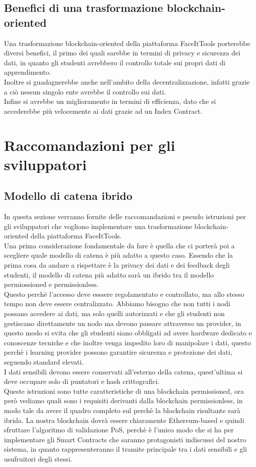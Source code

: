 \subsection{Benefici di una trasformazione blockchain-oriented}
Una trasformazione blockchain-oriented della piattaforma FaceItTools porterebbe diversi benefici, 
il primo dei quali sarebbe in termini di privacy e sicurezza dei dati, in quanto gli studenti avrebbero il controllo totale sui propri dati di apprendimento.
\\Inoltre si guadagnerebbe anche nell'ambito della decentralizzazione, infatti grazie a ciò nessun singolo ente avrebbe il controllo sui dati.
\\Infine si avrebbe un miglioramento in termini di efficienza, dato che si accederebbe più velocemente ai dati grazie ad un Index Contract.
\newpage
\section{Raccomandazioni per gli sviluppatori}
\subsection{Modello di catena ibrido}
In questa sezione verranno fornite delle raccomandazioni e pseudo istruzioni per gli sviluppatori che vogliono implementare una trasformazione blockchain-oriented della piattaforma FaceItTools.
\\Una prima considerazione fondamentale da fare è quella che ci porterà poi a scegliere quale modello di catena è più adatto a questo caso.
Essendo che la prima cosa da andare a rispettare è la privacy dei dati e dei feedback degli studenti, 
il modello di catena più adatto sarà un ibrido tra il modello permiossioned e permissionless.
\\Questo perchè l'accesso deve esssere regolamentato e controllato, ma allo stesso tempo non deve essere centralizzato.
Abbiamo bisogno che non tutti i nodi possano accedere ai dati, ma solo quelli autorizzati e che gli studenti non gestiscano direttamente un nodo ma devono passare attraverso un provider,
in questo modo  si evita che gli studenti siano obbligati ad avere hardware dedicato e conoscenze tecniche e che inoltre venga impedito loro di manipolare i dati, questo perchè
i learning provider possono garantire sicurezza e protezione dei dati, seguendo standard elevati.
\\I dati sensibili devono essere conservati all'esterno della catena, quest'ultima si deve occupare solo di puntatori e hash crittografici.
\\Queste istruzioni sono tutte caratteristiche di una blockchain permissioned, ora però vediamo quali sono i requisiti derivanti dalla blockchain permissionless, in modo tale da avere il quadro completo sul perchè la blockchain risultante sarà ibrida.
La nostra blockchain dovrà essere chiaramente Ethereum-based e quindi sfruttare l'algoritmo di validazione PoS, perchè è l'unico modo che si ha per implementare gli Smart Contracts
che saranno protagonisti indiscussi del nostro sistema, in quanto rappresenteranno il tramite principale tra i dati sensibili e gli usufruitori degli stessi.
